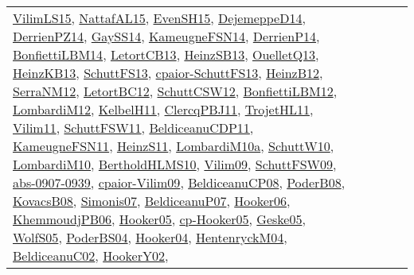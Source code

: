 {\begin{longtable}{lp{3cm}>{\raggedright}p{6cm}>{\raggedright}p{6cm}p{8cm}}
\href{papers/VilimLS15.pdf}{VilimLS15}\cite{VilimLS15}, \href{articles/NattafAL15.pdf}{NattafAL15}\cite{NattafAL15}, \href{papers/EvenSH15.pdf}{EvenSH15}\cite{EvenSH15}, \href{papers/DejemeppeD14.pdf}{DejemeppeD14}\cite{DejemeppeD14}, \href{papers/DerrienPZ14.pdf}{DerrienPZ14}\cite{DerrienPZ14}, \href{papers/GaySS14.pdf}{GaySS14}\cite{GaySS14}, \href{articles/KameugneFSN14.pdf}{KameugneFSN14}\cite{KameugneFSN14}, \href{papers/DerrienP14.pdf}{DerrienP14}\cite{DerrienP14}, \href{articles/BonfiettiLBM14.pdf}{BonfiettiLBM14}\cite{BonfiettiLBM14}, \href{papers/LetortCB13.pdf}{LetortCB13}\cite{LetortCB13}, \href{articles/HeinzSB13.pdf}{HeinzSB13}\cite{HeinzSB13}, \href{papers/OuelletQ13.pdf}{OuelletQ13}\cite{OuelletQ13}, \href{papers/HeinzKB13.pdf}{HeinzKB13}\cite{HeinzKB13}, \href{papers/SchuttFS13.pdf}{SchuttFS13}\cite{SchuttFS13}, \href{papers/cpaior-SchuttFS13.pdf}{cpaior-SchuttFS13}\cite{cpaior-SchuttFS13}, \href{papers/HeinzB12.pdf}{HeinzB12}\cite{HeinzB12}, \href{papers/SerraNM12.pdf}{SerraNM12}\cite{SerraNM12}, \href{papers/LetortBC12.pdf}{LetortBC12}\cite{LetortBC12}, \href{papers/SchuttCSW12.pdf}{SchuttCSW12}\cite{SchuttCSW12}, \href{papers/BonfiettiLBM12.pdf}{BonfiettiLBM12}\cite{BonfiettiLBM12}, \href{articles/LombardiM12.pdf}{LombardiM12}\cite{LombardiM12}, \href{articles/KelbelH11.pdf}{KelbelH11}\cite{KelbelH11}, \href{papers/ClercqPBJ11.pdf}{ClercqPBJ11}\cite{ClercqPBJ11}, \href{articles/TrojetHL11.pdf}{TrojetHL11}\cite{TrojetHL11}, \href{papers/Vilim11.pdf}{Vilim11}\cite{Vilim11}, \href{articles/SchuttFSW11.pdf}{SchuttFSW11}\cite{SchuttFSW11}, \href{articles/BeldiceanuCDP11.pdf}{BeldiceanuCDP11}\cite{BeldiceanuCDP11}, \href{papers/KameugneFSN11.pdf}{KameugneFSN11}\cite{KameugneFSN11}, \href{papers/HeinzS11.pdf}{HeinzS11}\cite{HeinzS11}, \href{articles/LombardiM10a.pdf}{LombardiM10a}\cite{LombardiM10a}, \href{papers/SchuttW10.pdf}{SchuttW10}\cite{SchuttW10}, \href{papers/LombardiM10.pdf}{LombardiM10}\cite{LombardiM10}, \href{papers/BertholdHLMS10.pdf}{BertholdHLMS10}\cite{BertholdHLMS10}, \href{papers/Vilim09.pdf}{Vilim09}\cite{Vilim09}, \href{papers/SchuttFSW09.pdf}{SchuttFSW09}\cite{SchuttFSW09}, \href{articles/abs-0907-0939.pdf}{abs-0907-0939}\cite{abs-0907-0939}, \href{papers/cpaior-Vilim09.pdf}{cpaior-Vilim09}\cite{cpaior-Vilim09}, \href{papers/BeldiceanuCP08.pdf}{BeldiceanuCP08}\cite{BeldiceanuCP08}, \href{papers/PoderB08.pdf}{PoderB08}\cite{PoderB08}, \href{articles/KovacsB08.pdf}{KovacsB08}\cite{KovacsB08}, \href{articles/Simonis07.pdf}{Simonis07}\cite{Simonis07}, \href{papers/BeldiceanuP07.pdf}{BeldiceanuP07}\cite{BeldiceanuP07}, \href{articles/Hooker06.pdf}{Hooker06}\cite{Hooker06}, \href{papers/KhemmoudjPB06.pdf}{KhemmoudjPB06}\cite{KhemmoudjPB06}, \href{articles/Hooker05.pdf}{Hooker05}\cite{Hooker05}, \href{papers/cp-Hooker05.pdf}{cp-Hooker05}\cite{cp-Hooker05}, \href{papers/Geske05.pdf}{Geske05}\cite{Geske05}, \href{papers/WolfS05.pdf}{WolfS05}\cite{WolfS05}, \href{articles/PoderBS04.pdf}{PoderBS04}\cite{PoderBS04}, \href{papers/Hooker04.pdf}{Hooker04}\cite{Hooker04}, \href{papers/HentenryckM04.pdf}{HentenryckM04}\cite{HentenryckM04}, \href{papers/BeldiceanuC02.pdf}{BeldiceanuC02}\cite{BeldiceanuC02}, \href{papers/HookerY02.pdf}{HookerY02}\cite{HookerY02}, 
\end{longtable}}
